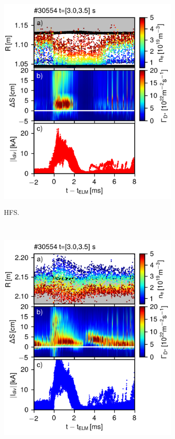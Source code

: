 \documentclass[12pt]{iopart}
\begin{document}
\begin{figure}[!hbt]
\centering
	\begin{subfigure}{3in}
    \includegraphics{ssidiv_30554_3_0_3_5_inin.png}
    \label{fig:elm_30554_HFS_II}
	\caption{HFS.}
	\end{subfigure}
	~
	\begin{subfigure}{3in}
    \includegraphics{ssidiv_30554_3_0_3_5_outout.png}

\end{subfigure}
\end{figure}
\end{document}
